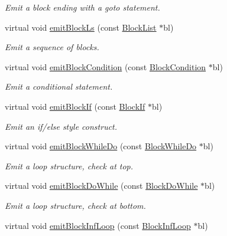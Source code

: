 \begin{DoxyCompactItemize}
\begin{DoxyCompactList}\small\item\em Emit a block ending with a goto statement. \end{DoxyCompactList}\item 
virtual void \mbox{\hyperlink{class_print_c_a0481482a247761069d030f40242e667a}{emit\+Block\+Ls}} (const \mbox{\hyperlink{class_block_list}{Block\+List}} $\ast$bl)
\begin{DoxyCompactList}\small\item\em Emit a sequence of blocks. \end{DoxyCompactList}\item 
virtual void \mbox{\hyperlink{class_print_c_a9ecd552720351716158ab4f5085d950e}{emit\+Block\+Condition}} (const \mbox{\hyperlink{class_block_condition}{Block\+Condition}} $\ast$bl)
\begin{DoxyCompactList}\small\item\em Emit a conditional statement. \end{DoxyCompactList}\item 
virtual void \mbox{\hyperlink{class_print_c_a8ec57580fdf84a0f9cff9d3e27c62254}{emit\+Block\+If}} (const \mbox{\hyperlink{class_block_if}{Block\+If}} $\ast$bl)
\begin{DoxyCompactList}\small\item\em Emit an if/else style construct. \end{DoxyCompactList}\item 
virtual void \mbox{\hyperlink{class_print_c_ac5165196d7d30a2cb5659af710d17bf3}{emit\+Block\+While\+Do}} (const \mbox{\hyperlink{class_block_while_do}{Block\+While\+Do}} $\ast$bl)
\begin{DoxyCompactList}\small\item\em Emit a loop structure, check at top. \end{DoxyCompactList}\item 
virtual void \mbox{\hyperlink{class_print_c_a57f431ca467a67aceba4e755e87af6b1}{emit\+Block\+Do\+While}} (const \mbox{\hyperlink{class_block_do_while}{Block\+Do\+While}} $\ast$bl)
\begin{DoxyCompactList}\small\item\em Emit a loop structure, check at bottom. \end{DoxyCompactList}\item 
virtual void \mbox{\hyperlink{class_print_c_a895370c4d12dff0e264bef9ad63fe926}{emit\+Block\+Inf\+Loop}} (const \mbox{\hyperlink{class_block_inf_loop}{Block\+Inf\+Loop}} $\ast$bl)

\end{DoxyCompactItemize}
